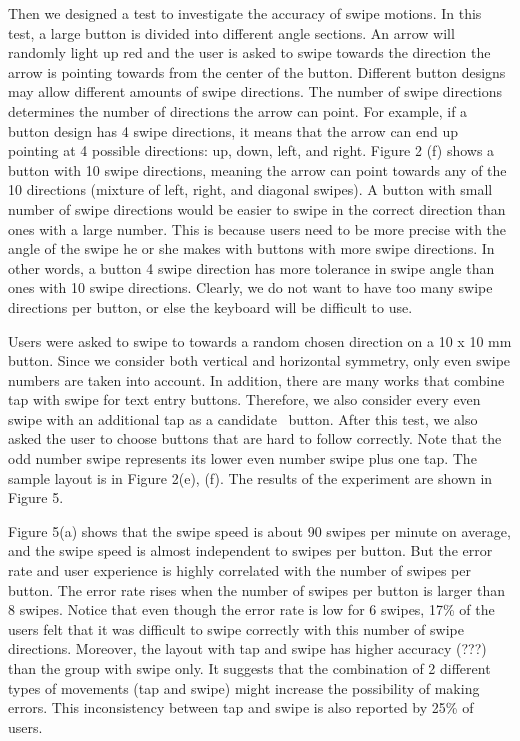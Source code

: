 Then we designed a test to investigate the accuracy of swipe motions. In this test, a large button is divided into different angle sections. An arrow will randomly light up red and the user is asked to swipe towards the direction the arrow is pointing towards from the center of the button. Different button designs may allow different amounts of swipe directions. The number of swipe directions determines the number of directions the arrow can point. For example, if a button design has 4 swipe directions, it means that the arrow can end up pointing at 4 possible directions: up, down, left, and right. Figure 2 (f) shows a button with 10 swipe directions, meaning the arrow can point towards any of the 10 directions (mixture of left, right, and diagonal swipes). A button with small number of swipe directions would be easier to swipe in the correct direction than ones with a large number. This is because users need to be more precise with the angle of the swipe he or she makes with buttons with more swipe directions. In other words, a button 4 swipe direction has more tolerance in swipe angle than ones with 10 swipe directions. Clearly, we do not want to have too many swipe directions per button, or else the keyboard will be difficult to use.

Users were asked to swipe to towards a random chosen direction on a 10 x 10 mm button. Since we consider both vertical and horizontal symmetry, only even swipe numbers are taken into account. In addition, there are many works that combine tap with swipe for text entry buttons. Therefore, we also consider every even swipe with an additional tap as a candidate \papertitle\ button. After this test, we also asked the user to choose buttons that are hard to follow correctly. Note that the odd number swipe represents its lower even number swipe plus one tap. The sample layout is in Figure 2(e), (f). The results of the experiment are shown in Figure 5.

Figure 5(a) shows that the swipe speed is about 90 swipes per minute on average, and the swipe speed is almost independent to swipes per button. But the error rate and user experience is highly correlated with the number of swipes per button. The error rate rises when the number of swipes per button is larger than 8 swipes. Notice that even though the error rate is low for 6 swipes, 17\% of the users felt that it was difficult to swipe correctly with this number of swipe directions. Moreover, the layout with tap and swipe has higher accuracy (???) than the group with swipe only. It suggests that the combination of 2 different types of movements (tap and swipe) might increase the possibility of making errors. This inconsistency between tap and swipe is also reported by 25\% of users. 

